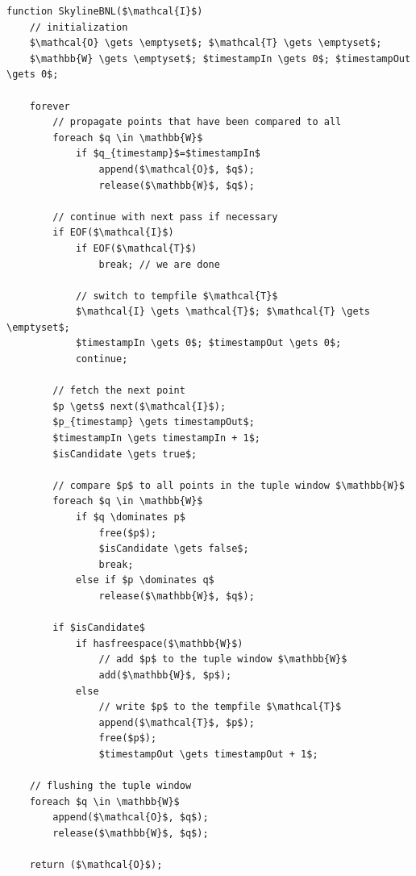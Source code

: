 \begin{lstlisting}[language=pseudo,
caption={Pseudo-code for Fixed Block-Nested-Loops (BNL) Algorithm},
label={code:fixedbnl}
]
function SkylineBNL($\mathcal{I}$) 
	// initialization
	$\mathcal{O} \gets \emptyset$; $\mathcal{T} \gets \emptyset$;
	$\mathbb{W} \gets \emptyset$; $timestampIn \gets 0$; $timestampOut
\gets 0$;

	forever
		// propagate points that have been compared to all
		foreach $q \in \mathbb{W}$
			if $q_{timestamp}$=$timestampIn$
				append($\mathcal{O}$, $q$);
				release($\mathbb{W}$, $q$);

		// continue with next pass if necessary
		if EOF($\mathcal{I}$)
			if EOF($\mathcal{T}$)
				break; // we are done

			// switch to tempfile $\mathcal{T}$
			$\mathcal{I} \gets \mathcal{T}$; $\mathcal{T} \gets \emptyset$;
			$timestampIn \gets 0$; $timestampOut \gets 0$;
			continue;

		// fetch the next point
		$p \gets$ next($\mathcal{I}$);
		$p_{timestamp} \gets timestampOut$;
		$timestampIn \gets timestampIn + 1$;
		$isCandidate \gets true$;

		// compare $p$ to all points in the tuple window $\mathbb{W}$
		foreach $q \in \mathbb{W}$
			if $q \dominates p$
				free($p$);
				$isCandidate \gets false$;
				break;
			else if $p \dominates q$
				release($\mathbb{W}$, $q$);

		if $isCandidate$
			if hasfreespace($\mathbb{W}$)
				// add $p$ to the tuple window $\mathbb{W}$
				add($\mathbb{W}$, $p$);
			else
				// write $p$ to the tempfile $\mathcal{T}$
				append($\mathcal{T}$, $p$);
				free($p$);
				$timestampOut \gets timestampOut + 1$;

	// flushing the tuple window
	foreach $q \in \mathbb{W}$
		append($\mathcal{O}$, $q$);
		release($\mathbb{W}$, $q$);

	return ($\mathcal{O}$);
\end{lstlisting}

